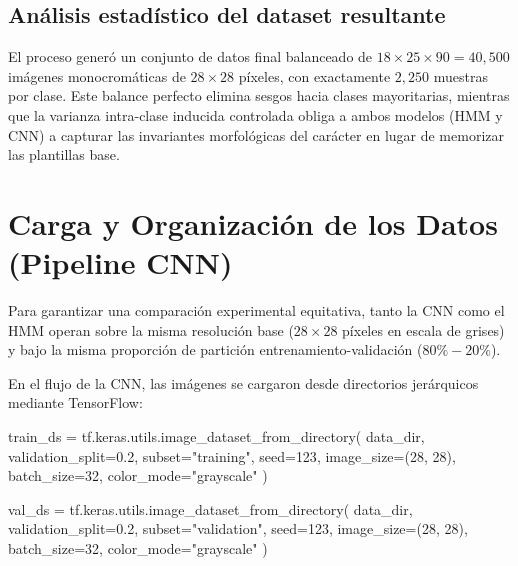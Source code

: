 \documentclass[
  spanish,
  us-letterpaper,
]{scrreprt}
\newenvironment{Shaded}{\begin{snugshade}}{\end{snugshade}}
\newcommand{\DecValTok}[1]{\textcolor[rgb]{0.68,0.00,0.00}{#1}}
\newcommand{\FloatTok}[1]{\textcolor[rgb]{0.68,0.00,0.00}{#1}}
\newcommand{\NormalTok}[1]{\textcolor[rgb]{0.00,0.23,0.31}{#1}}
\newcommand{\OperatorTok}[1]{\textcolor[rgb]{0.37,0.37,0.37}{#1}}
\newcommand{\StringTok}[1]{\textcolor[rgb]{0.13,0.47,0.30}{#1}}
\theoremstyle{definition}
\theoremstyle{remark}
\begin{document}
\subsection{Análisis estadístico del dataset
resultante}\label{anuxe1lisis-estaduxedstico-del-dataset-resultante}

El proceso generó un conjunto de datos final balanceado de
\(18 \times 25 \times 90 = 40{,}500\) imágenes monocromáticas de
\(28 \times 28\) píxeles, con exactamente \(2{,}250\) muestras por
clase. Este balance perfecto elimina sesgos hacia clases mayoritarias,
mientras que la varianza intra-clase inducida controlada obliga a ambos
modelos (HMM y CNN) a capturar las invariantes morfológicas del carácter
en lugar de memorizar las plantillas base.

\section{Carga y Organización de los Datos (Pipeline
CNN)}\label{carga-y-organizaciuxf3n-de-los-datos-pipeline-cnn}

Para garantizar una comparación experimental equitativa, tanto la CNN
como el HMM operan sobre la misma resolución base (\(28 \times 28\)
píxeles en escala de grises) y bajo la misma proporción de partición
entrenamiento-validación (\(80\% - 20\%\)).

En el flujo de la CNN, las imágenes se cargaron desde directorios
jerárquicos mediante TensorFlow:

\begin{Shaded}
\begin{Highlighting}[]
\NormalTok{train\_ds }\OperatorTok{=}\NormalTok{ tf.keras.utils.image\_dataset\_from\_directory(}
\NormalTok{    data\_dir,}
\NormalTok{    validation\_split}\OperatorTok{=}\FloatTok{0.2}\NormalTok{,}
\NormalTok{    subset}\OperatorTok{=}\StringTok{"training"}\NormalTok{,}
\NormalTok{    seed}\OperatorTok{=}\DecValTok{123}\NormalTok{,}
\NormalTok{    image\_size}\OperatorTok{=}\NormalTok{(}\DecValTok{28}\NormalTok{, }\DecValTok{28}\NormalTok{),}
\NormalTok{    batch\_size}\OperatorTok{=}\DecValTok{32}\NormalTok{,}
\NormalTok{    color\_mode}\OperatorTok{=}\StringTok{"grayscale"}
\NormalTok{)}

\NormalTok{val\_ds }\OperatorTok{=}\NormalTok{ tf.keras.utils.image\_dataset\_from\_directory(}
\NormalTok{    data\_dir,}
\NormalTok{    validation\_split}\OperatorTok{=}\FloatTok{0.2}\NormalTok{,}
\NormalTok{    subset}\OperatorTok{=}\StringTok{"validation"}\NormalTok{,}
\NormalTok{    seed}\OperatorTok{=}\DecValTok{123}\NormalTok{,}
\NormalTok{    image\_size}\OperatorTok{=}\NormalTok{(}\DecValTok{28}\NormalTok{, }\DecValTok{28}\NormalTok{),}
\NormalTok{    batch\_size}\OperatorTok{=}\DecValTok{32}\NormalTok{,}
\NormalTok{    color\_mode}\OperatorTok{=}\StringTok{"grayscale"}
\NormalTok{)}
\end{Highlighting}
\end{Shaded}
\end{document}
